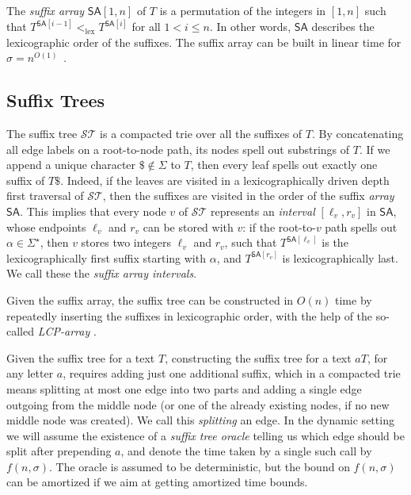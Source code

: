 \documentclass[11pt,onecolumn,final]{article} \usepackage{a4}
\newcommand{\SA}[0]{\mathsf{SA}} \newcommand{\ST}[0]{\mathcal{ST}} \newcommand{\SF}[1]{T^{#1}} \newcommand{\pred}{\textsc{Pred}}
\theoremstyle{plain}
\theoremstyle{remark}
\begin{document}
The \emph{suffix array} $\SA[1,n]$ of $T$ is a permutation of the integers in $[1,n]$ such that $\SF{\SA[i-1]} <_\mathrm{lex} \SF{\SA[i]}$ for all $1 < i \le n$. In other words, $\SA$ describes the lexicographic order of the suffixes. The suffix array can be built in linear time for $\sigma=n^{O(1)}$~\cite{kaerkkaeinen06linear}.

\subsection{Suffix Trees}
The suffix tree $\ST$ is a compacted trie over all the suffixes of $T$. By concatenating all edge labels on a root-to-node path, its nodes spell out substrings of $T$. If we append a unique character $\$\not\in\Sigma$ to $T$, then every leaf spells out exactly one suffix of $T\$$. Indeed, if the leaves are visited in a lexicographically driven depth first traversal of $\ST$, then the suffixes are visited in the order of the suffix \emph{array} $\SA$. This implies that every node $v$ of $\ST$ represents an \emph{interval} $[\ell_v,r_v]$ in $\SA$, whose endpoints $\ell_v$ and $r_v$ can be stored with $v$: if the root-to-$v$ path spells out $\alpha\in\Sigma^\star$, then $v$ stores two integers $\ell_v$ and $r_v$, such that $\SF{\SA[\ell_v]}$ is the lexicographically first suffix starting with $\alpha$, and $\SF{\SA[r_v]}$ is lexicographically last. We call these the \emph{suffix array intervals}.

Given the suffix array, the suffix tree can be constructed in $O(n)$ time by repeatedly inserting the suffixes in lexicographic order, with the help of the so-called \emph{LCP-array} \cite{gusfield97algorithms}.

Given the suffix tree for a text $T$, constructing the suffix tree for a text $aT$, for any letter $a$, requires adding just one additional suffix, which in a compacted trie means splitting at most one edge into two parts and adding a single edge outgoing from the middle node (or one of the already existing nodes, if no new middle node was created). We call this \emph{splitting} an edge. In the dynamic setting we will assume the existence of a \emph{suffix tree oracle} telling us which edge should be split after prepending $a$, and denote the time taken by a single such call by $f(n,\sigma)$. The oracle is assumed to be deterministic, but the bound on $f(n,\sigma)$ can be amortized if we aim at getting amortized time bounds.
\end{document}
